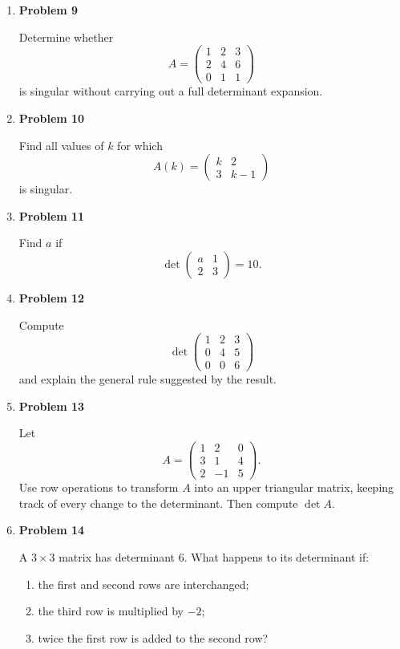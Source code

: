\begin{enumerate}
\item \textbf{Problem 9}\par
Determine whether
\[
A=\begin{pmatrix}
1&2&3\\
2&4&6\\
0&1&1
\end{pmatrix}
\]
is singular without carrying out a full determinant expansion.

\item \textbf{Problem 10}\par
Find all values of \(k\) for which
\[
A(k)=\begin{pmatrix}
k&2\\
3&k-1
\end{pmatrix}
\]
is singular.

\item \textbf{Problem 11}\par
Find \(a\) if
\[
\det\begin{pmatrix}
a&1\\
2&3
\end{pmatrix}=10.
\]

\item \textbf{Problem 12}\par
Compute
\[
\det\begin{pmatrix}
1&2&3\\
0&4&5\\
0&0&6
\end{pmatrix}
\]
and explain the general rule suggested by the result.

\item \textbf{Problem 13}\par
Let
\[
A=\begin{pmatrix}
1&2&0\\
3&1&4\\
2&-1&5
\end{pmatrix}.
\]
Use row operations to transform \(A\) into an upper triangular matrix, keeping track of every change to the determinant. Then compute \(\det A\).

\item \textbf{Problem 14}\par
A \(3\times3\) matrix has determinant \(6\). What happens to its determinant if:
\begin{enumerate}
\item the first and second rows are interchanged;
\item the third row is multiplied by \(-2\);
\item twice the first row is added to the second row?
\end{enumerate}


\end{enumerate}
